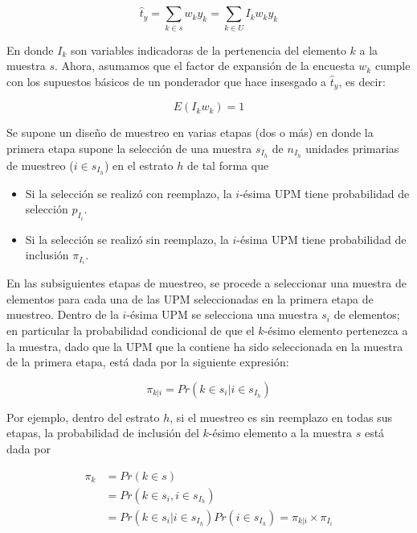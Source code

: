 \documentclass[
  12pt,
  spanish,
]{book}
\providecommand{\tightlist}{%
  \setlength{\itemsep}{0pt}\setlength{\parskip}{0pt}}
\begin{document}
\begin{equation}
\label{est}
\hat{t}_{y}=\sum_{k\in s} w_k y_k = \sum_{k\in U} I_k w_k y_k 
\end{equation}

En donde \(I_k\) son variables indicadoras de la pertenencia del elemento \(k\) a la muestra \(s\). Ahora, asumamos que el factor de expansión de la encuesta \(w_k\) cumple con los supuestos básicos de un ponderador que hace insesgado a \(\hat{t}_{y}\), es decir:

\begin{equation*}
E(I_k w_k) = 1
\end{equation*}

Se supone un diseño de muestreo en varias etapas (dos o más) en donde la primera etapa supone la selección de una muestra \(s_{I_h}\) de \(n_{I_h}\) unidades primarias de muestreo (\(i\in s_{I_h}\)) en el estrato \(h\) de tal forma que

\begin{itemize}
\tightlist
\item
  Si la selección se realizó con reemplazo, la \(i\)-ésima UPM tiene probabilidad de selección \(p_{I_i}\).
\item
  Si la selección se realizó sin reemplazo, la \(i\)-ésima UPM tiene probabilidad de inclusión \(\pi_{I_i}\).
\end{itemize}

En las subsiguientes etapas de muestreo, se procede a seleccionar una muestra de elementos para cada una de las UPM seleccionadas en la primera etapa de muestreo. Dentro de la \(i\)-ésima UPM se selecciona una muestra \(s_i\) de elementos; en particular la probabilidad condicional de que el \(k\)-ésimo elemento pertenezca a la muestra, dado que la UPM que la contiene ha sido seleccionada en la muestra de la primera etapa, está dada por la siguiente expresión:

\begin{equation*}
\pi_{k|i} = Pr(k \in s_i | i \in s_{I_h})
\end{equation*}

Por ejemplo, dentro del estrato \(h\), si el muestreo es sin reemplazo en todas sus etapas, la probabilidad de inclusión del \(k\)-ésimo elemento a la muestra \(s\) está dada por

\begin{align*}
\label{piki}
\pi_k & = Pr(k \in s)\\ 
& = Pr(k \in s_i, i \in s_{I_h}) \\
& = Pr(k \in s_i | i \in s_{I_h}) Pr(i \in s_{I_h}) = \pi_{k|i} \times \pi_{I_i}
\end{align*}
\end{document}
